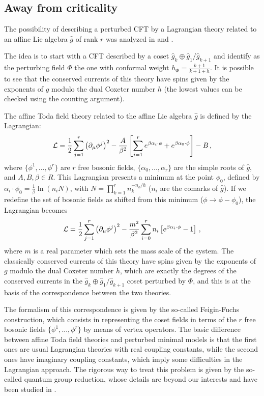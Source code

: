 \documentclass[a4paper,12pt]{report}
\begin{document}
\subsection{Away from criticality}

The possibility of describing a perturbed CFT by a Lagrangian theory related to an affine Lie algebra $\hat{g}$
of rank $r$ was analyzed in \cite{egyang} and \cite{hollmansf}.

The idea is to start with a CFT described by a coset $\hat{g}_{k}\oplus\hat{g}_{1}/\hat{g}_{k+1}$ and identify as
the perturbing field $\Phi$ the one with conformal weight $h_{\Phi}=\frac{k+1}{k+1+h}$. It is possible to see
that the conserved currents of this theory have spins given by the exponents of $g$ modulo the dual Coxeter
number $h$ (the lowest values can be checked using the counting argument).

The affine Toda field theory related to the affine Lie algebra $\hat{g}$ is defined by the Lagrangian:
\begin{equation}
{\cal
L}=\frac{1}{2}\sum_{j=1}^{r}\left(\partial_{\mu}\phi^{j}\right)^{2}-\frac{A}{\beta^{2}}\left[\sum_{i=1}^{r}e^{\beta\alpha_{i}\cdot\phi}+e^{\beta\alpha_{0}\cdot\phi}\right]-B\,,
\end{equation}
where $\{\phi^{1},...,\phi^{r}\}$ are $r$ free bosonic fields, $\{\alpha_{0},...,\alpha_{r}\}$ are the simple
roots of $\hat{g}$, and $A,B,\beta\in R$. This Lagrangian presents a minimum at the point $\phi_{0}$, defined by
$\alpha_{i}\cdot \phi_{0}=\frac{1}{\beta}\ln (n_{i}N)$, with $N=\prod_{k=1}^{r}n_{k}^{-n_{k}/h}$ ($n_{i}$ are the
comarks of $\hat{g}$). If we redefine the set of bosonic fields as shifted from this minimum
($\phi\rightarrow\phi-\phi_{0}$), the Lagrangian becomes
\begin{equation}\label{todalagr}
{\cal
L}=\frac{1}{2}\sum_{j=1}^{r}\left(\partial_{\mu}\phi^{j}\right)^{2}-\frac{m^{2}}{\beta^{2}}\sum_{i=0}^{r}n_{i}\left[e^{\beta\alpha_{i}\cdot\phi}-1\right]\,,
\end{equation}
where $m$ is a real parameter which sets the mass scale of the system. The classically conserved currents of this
theory have spins given by the exponents of $g$ modulo the dual Coxeter number $h$, which are exactly the degrees
of the conserved currents in the $\hat{g}_{k}\oplus\hat{g}_{1}/\hat{g}_{k+1}$ coset perturbed by $\Phi$, and this
is at the basis of the correspondence between the two theories.

The formalism of this correspondence is given by the so-called Feigin-Fuchs construction, which consists in
representing the coset fields in terms of the $r$ free bosonic fields $\{\phi^{1},...,\phi^{r}\}$ by means of
vertex operators. The basic difference between affine Toda field theories and perturbed minimal models is that
the first ones are usual Lagrangian theories with real coupling constants, while the second ones have imaginary
coupling constants, which imply some difficulties in the Lagrangian approach. The rigorous way to treat this
problem is given by the so-called quantum group reduction, whose details are beyond our interests and have been
studied in \cite{smirnov}.
\end{document}
